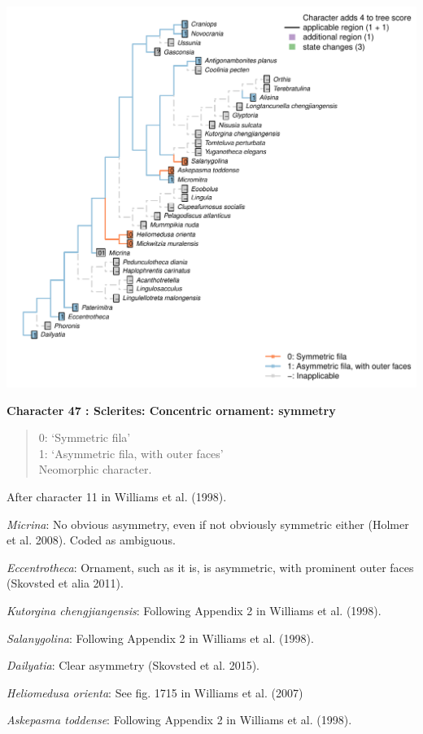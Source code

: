 \documentclass[]{book}
\theoremstyle{definition}
\theoremstyle{definition}
\theoremstyle{definition}
\theoremstyle{remark}
\begin{document}
\includegraphics{Brachiopod_phylogeny_files/figure-latex/unnamed-chunk-5-47.pdf}

\textbf{Character 47 : Sclerites: Concentric ornament: symmetry }

\begin{quote}
0: `Symmetric fila'\\
1: `Asymmetric fila, with outer faces'\\
Neomorphic character.
\end{quote}

After character 11 in Williams et al. (1998).

\emph{Micrina}: No obvious asymmetry, even if not obviously symmetric
either (Holmer et al. 2008). Coded as ambiguous.

\emph{Eccentrotheca}: Ornament, such as it is, is asymmetric, with
prominent outer faces (Skovsted et alia 2011).

\emph{Kutorgina chengjiangensis}: Following Appendix 2 in Williams et
al. (1998).

\emph{Salanygolina}: Following Appendix 2 in Williams et al. (1998).

\emph{Dailyatia}: Clear asymmetry (Skovsted et al. 2015).

\emph{Heliomedusa orienta}: See fig. 1715 in Williams et al. (2007)

\emph{Askepasma toddense}: Following Appendix 2 in Williams et al.
(1998).
\end{document}
